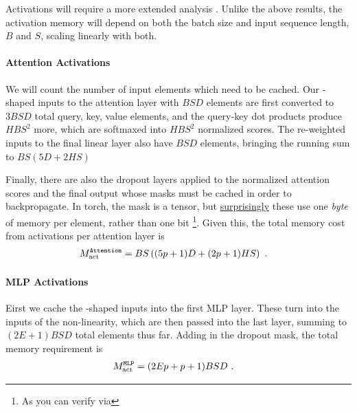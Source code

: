 \documentclass[11pt]{article}
\begin{document}
Activations will require a more extended analysis \cite{korthikanti2022reducing}. Unlike the above
results, the activation memory will depend on both the batch size and input sequence length, $ B $
and $ S $, scaling linearly with both.



\paragraph{Attention Activations}

We will count the number of input elements which need to be cached. Our -shaped inputs
to the attention layer with $ BSD $ elements are first converted to $ 3BSD $ total query, key, value
elements, and the query-key dot products produce $ HBS ^{ 2 } $ more, which are softmaxed into $ HBS
^{ 2 } $ normalized scores. The re-weighted inputs to the final linear layer also have $ BSD $
elements, bringing the running sum to $ BS \left ( 5D + 2HS  \right ) $

Finally, there are also the dropout layers applied to the normalized attention scores and the final
output whose masks must be cached in order to
backpropagate. In torch, the mask is a  tensor, but
\href{https://github.com/pytorch/pytorch/issues/41571}{surprisingly} these use one \textit{byte} of
memory per element, rather than one bit \footnote{As you can verify
via }.
Given this, the total memory cost from activations per attention layer is
\begin{align}
M _{ \rm act  } ^\texttt{Attention} &= BS \left ( (5p+1)D + (2p+1)HS  \right ) \ .
\label{eq_att_actmem_vanilla}
\end{align}




\paragraph{MLP Activations}

  Eirst we cache the
-shaped inputs into the first MLP layer. These turn into the
 inputs of the non-linearity, which are then passed into the last
 layer, summing to $ (2E+1)BSD $ total elements thus far. Adding in the dropout
mask, the total memory requirement is
\begin{align}
M _{ \rm act  } ^\texttt{MLP} &= (2Ep+p+1)BSD\ .
\label{eq_mlp_actmem_vanilla}
\end{align}
\end{document}
